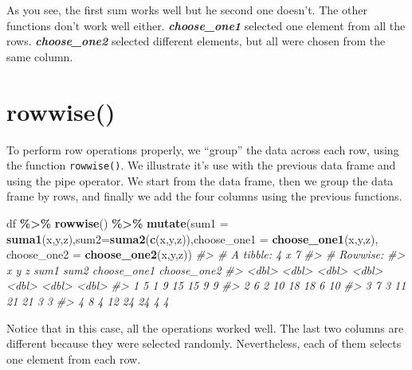 \documentclass[
]{book}
\newenvironment{Shaded}{\begin{snugshade}}{\end{snugshade}}
\newcommand{\AttributeTok}[1]{\textcolor[rgb]{0.13,0.29,0.53}{#1}}
\newcommand{\CommentTok}[1]{\textcolor[rgb]{0.56,0.35,0.01}{\textit{#1}}}
\newcommand{\FunctionTok}[1]{\textcolor[rgb]{0.13,0.29,0.53}{\textbf{#1}}}
\newcommand{\NormalTok}[1]{#1}
\newcommand{\SpecialCharTok}[1]{\textcolor[rgb]{0.81,0.36,0.00}{\textbf{#1}}}
\theoremstyle{definition}
\theoremstyle{definition}
\theoremstyle{definition}
\theoremstyle{definition}
\theoremstyle{remark}
\begin{document}
As you see, the first sum works well but he second one doesn't. The other functions don't work well either. \textbf{\emph{choose\_one1}} selected one element from all the rows. \textbf{\emph{choose\_one2}} selected different elements, but all were chosen from the same column.

\hypertarget{rowwise}{%
\section{rowwise()}\label{rowwise}}

To perform row operations properly, we ``group'' the data across each row, using the function \texttt{rowwise()}. We illustrate it's use with the previous data frame and using the pipe operator. We start from the data frame, then we group the data frame by rows, and finally we add the four columns using the previous functions.

\begin{Shaded}
\begin{Highlighting}[]
\NormalTok{df }\SpecialCharTok{\%\textgreater{}\%}
  \FunctionTok{rowwise}\NormalTok{() }\SpecialCharTok{\%\textgreater{}\%}
  \FunctionTok{mutate}\NormalTok{(}\AttributeTok{sum1 =} \FunctionTok{suma1}\NormalTok{(x,y,z),}\AttributeTok{sum2=}\FunctionTok{suma2}\NormalTok{(}\FunctionTok{c}\NormalTok{(x,y,z)),}\AttributeTok{choose\_one1 =} \FunctionTok{choose\_one1}\NormalTok{(x,y,z), }\AttributeTok{choose\_one2 =} \FunctionTok{choose\_one2}\NormalTok{(x,y,z))}
\CommentTok{\#\textgreater{} \# A tibble: 4 x 7}
\CommentTok{\#\textgreater{} \# Rowwise: }
\CommentTok{\#\textgreater{}       x     y     z  sum1  sum2 choose\_one1 choose\_one2}
\CommentTok{\#\textgreater{}   \textless{}dbl\textgreater{} \textless{}dbl\textgreater{} \textless{}dbl\textgreater{} \textless{}dbl\textgreater{} \textless{}dbl\textgreater{}       \textless{}dbl\textgreater{}       \textless{}dbl\textgreater{}}
\CommentTok{\#\textgreater{} 1     5     1     9    15    15           9           9}
\CommentTok{\#\textgreater{} 2     6     2    10    18    18           6          10}
\CommentTok{\#\textgreater{} 3     7     3    11    21    21           3           3}
\CommentTok{\#\textgreater{} 4     8     4    12    24    24           4           4}
\end{Highlighting}
\end{Shaded}

Notice that in this case, all the operations worked well. The last two columns are different because they were selected randomly. Nevertheless, each of them selects one element from each row.
\end{document}
